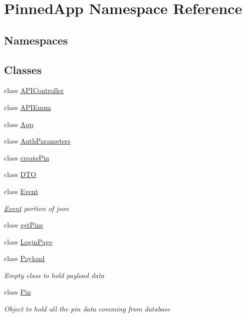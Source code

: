 \hypertarget{namespace_pinned_app}{}\section{Pinned\+App Namespace Reference}
\label{namespace_pinned_app}
\subsection*{Namespaces}
\begin{DoxyCompactItemize}
\end{DoxyCompactItemize}
\subsection*{Classes}
\begin{DoxyCompactItemize}
\item 
class \hyperlink{class_pinned_app_1_1_a_p_i_controller}{A\+P\+I\+Controller}
\item 
class \hyperlink{class_pinned_app_1_1_a_p_i_enum}{A\+P\+I\+Enum}
\item 
class \hyperlink{class_pinned_app_1_1_app}{App}
\item 
class \hyperlink{class_pinned_app_1_1_auth_parameters}{Auth\+Parameters}
\item 
class \hyperlink{class_pinned_app_1_1create_pin}{create\+Pin}
\item 
class \hyperlink{class_pinned_app_1_1_d_t_o}{D\+TO}
\item 
class \hyperlink{class_pinned_app_1_1_event}{Event}
\begin{DoxyCompactList}\small\item\em \hyperlink{class_pinned_app_1_1_event}{Event} portion of json \end{DoxyCompactList}\item 
class \hyperlink{class_pinned_app_1_1get_pins}{get\+Pins}
\item 
class \hyperlink{class_pinned_app_1_1_login_page}{Login\+Page}
\item 
class \hyperlink{class_pinned_app_1_1_payload}{Payload}
\begin{DoxyCompactList}\small\item\em Empty class to hold payload data \end{DoxyCompactList}\item 
class \hyperlink{class_pinned_app_1_1_pin}{Pin}
\begin{DoxyCompactList}\small\item\em Object to hold all the pin data comming from database \end{DoxyCompactList}\item 

\end{DoxyCompactItemize}
